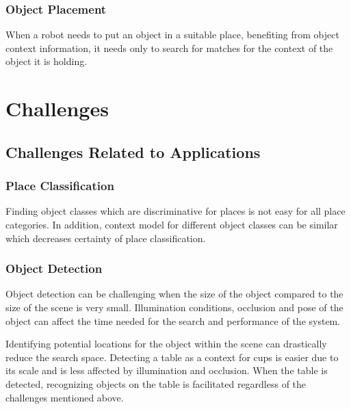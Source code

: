  
 
 \subsubsection*{Object Placement} 
 
 When a robot needs to put an object in a suitable place, benefiting from object context information, it needs only to search for 
 matches for the context of the object it is holding. 
 

\section{Challenges}
\label{Challenges.sec}

\subsection{Challenges Related to Applications }%
\label{ChallengesRelatedtoApplications.ssec}

\subsubsection{Place Classification}
\label{placeclassification.ssec}
Finding object classes which are discriminative for places is not easy for all place categories. In addition, context model
for different object classes can be similar which decreases certainty of place classification.  

\subsubsection{Object Detection}
\label{objectdetection.ssec}
Object detection can be challenging when the size of the object compared to the size of the scene is very small. 
Illumination conditions, occlusion and pose of the object can affect the time needed for the search and performance of the system. 

Identifying potential locations for the object within the scene can drastically reduce the search space. 
Detecting a table as a context for cups is easier due to its scale and is less affected by illumination and 
occlusion. 
When the table is detected, recognizing objects on the table is facilitated regardless of the challenges mentioned above.

